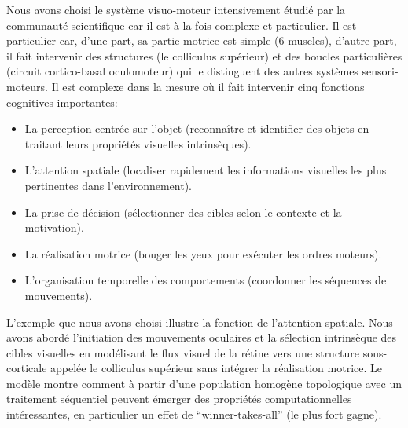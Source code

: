 \begin{itemize}
Nous avons choisi le système visuo-moteur intensivement étudié par la communauté scientifique car il est à la fois complexe et particulier. Il est particulier car, d'une part, sa partie motrice est simple (6 muscles), d'autre part, il fait intervenir des structures (le colliculus supérieur) et des boucles particulières (circuit cortico-basal oculomoteur) qui le distinguent des autres systèmes sensori-moteurs. Il est complexe dans la mesure o\`u il fait intervenir cinq fonctions cognitives importantes: \\
\begin{itemize}  
\item La perception centrée sur l'objet (reconnaître et identifier des objets en traitant leurs propriétés visuelles intrinsèques).  
\item L'attention spatiale  (localiser rapidement les informations visuelles les plus pertinentes dans l'environnement). 
\item La prise de décision (sélectionner des cibles selon le contexte et la motivation).
\item La réalisation motrice (bouger les yeux pour exécuter les ordres moteurs).
\item L'organisation temporelle des comportements (coordonner les séquences de mouvements).\\
\end{itemize}

L'exemple que nous avons choisi illustre la fonction de l'attention spatiale. Nous avons abordé l'initiation des mouvements oculaires et la sélection intrinsèque des cibles visuelles en modélisant le flux visuel de la rétine vers une structure sous-corticale appelée le colliculus supérieur sans intégrer la réalisation motrice. Le modèle montre comment à partir d'une population homogène topologique avec un traitement séquentiel peuvent émerger des propriétés computationnelles intéressantes, en particulier un effet de ``winner-takes-all'' (le plus fort gagne).\\


\end{itemize}
